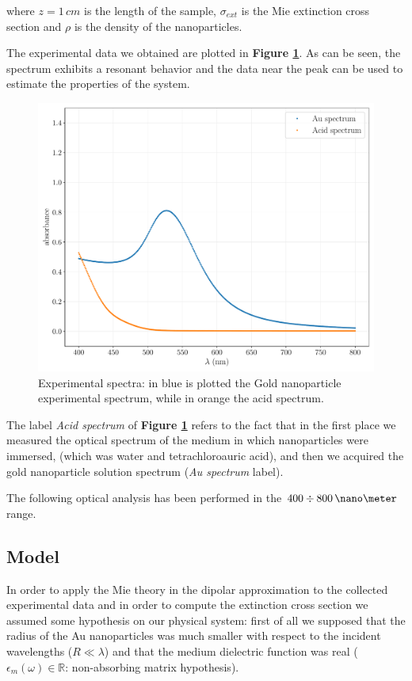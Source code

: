 \documentclass[twocolumn]{article}
\begin{document}
\begin{multicols}{2}
\noindent
where $z=1\, cm$ is the length of the sample, $\sigma_{ext}$ is the Mie extinction cross section and $\rho$ is the density of the nanoparticles.

The experimental data we obtained are plotted in \textbf{Figure \ref{fig:exp_data}}. As can be seen, the spectrum exhibits a resonant behavior and the data near the peak can be used to estimate the properties of the system.

\begin{figure}[H]
    \centering
    \includegraphics[width=\linewidth]{image/data/exp_data.pdf}
    \caption{Experimental spectra: in blue is plotted the Gold nanoparticle experimental spectrum, while in orange the acid spectrum.}
    \label{fig:exp_data}
\end{figure}

The label \textit{Acid spectrum} of \textbf{Figure \ref{fig:exp_data}} refers to the fact that in the first place we measured the optical spectrum of the medium in which nanoparticles were immersed, (which was water and tetrachloroauric acid),  and then we acquired the gold
nanoparticle solution spectrum (\textit{Au spectrum} label).

The following optical analysis has been performed in the $400 \div 800\,\nano\meter$ range.

\subsection{Model}
In order to apply the Mie theory in the dipolar approximation to the collected experimental data and in order to compute the extinction cross section we assumed some hypothesis on our physical system: first of all we supposed that the radius of the Au nanoparticles was much smaller with respect to the incident wavelengths ($R\ll \lambda$) and that the medium dielectric function was real ($\epsilon_m(\omega) \in \mathbb{R}$: non-absorbing matrix hypothesis). 


\end{multicols}
\end{document}
